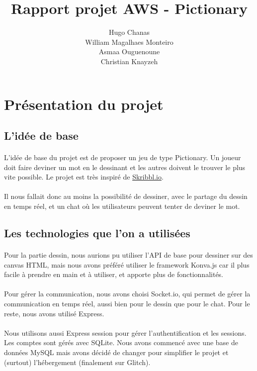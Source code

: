 \documentclass[11pt,a4paper]{article}
\date{}
\title{Rapport projet AWS - Pictionary}
\author{ Hugo Chanas \\ William Magalhaes Monteiro \\ Asmaa Ouguenoune \\ Christian Knayzeh }
\begin{document}
    \maketitle
    \section{Présentation du projet}
        \subsection{L'idée de base}
            \paragraph{}
            L'idée de base du projet est de proposer un jeu de type Pictionary.
            Un joueur doit faire deviner un mot en le dessinant et les autres doivent le trouver le plus vite possible.
            Le projet est très inspiré de \href{https://skribbl.io/}{Skribbl.io}.
            \paragraph{}
            Il nous fallait donc au moins la possibilité de dessiner, avec le partage du dessin en temps réel,
            et un chat où les utilisateurs peuvent tenter de deviner le mot.
        \subsection{Les technologies que l'on a utilisées}
            \paragraph{}
            Pour la partie dessin, nous aurions pu utiliser l'API de base pour dessiner sur des canvas HTML,
            mais nous avons préféré utiliser le framework Konva.js car il plus facile à prendre en main et à utiliser,
            et apporte plus de fonctionnalités.
            \paragraph{}
            Pour gérer la communication, nous avons choisi Socket.io, qui permet de gérer la communication en temps réel,
            aussi bien pour le dessin que pour le chat. Pour le reste, nous avons utilisé Express.
            \paragraph{}
            Nous utilisons aussi Express session pour gérer l'authentification et les sessions.
            Les comptes sont gérés avec SQLite.
            Nous avons commencé avec une base de données MySQL mais avons décidé de changer pour simplifier le projet et (surtout) l'hébergement (finalement sur Glitch).
\end{document}
